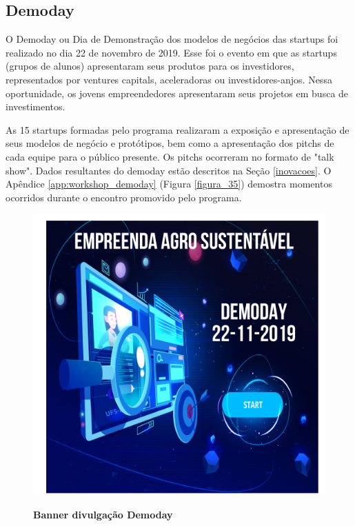 \subsection{Demoday}

O Demoday ou Dia de Demonstração dos modelos de negócios das startups foi realizado no dia 22 de novembro de 2019. Esse foi o evento em que as startups (grupos de alunos) apresentaram seus produtos para os investidores, representados por ventures capitals, aceleradoras ou investidores-anjos. Nessa oportunidade, os jovens empreendedores apresentaram seus projetos em busca de investimentos.

As 15 startups formadas pelo programa realizaram a exposição e apresentação de seus modelos de negócio e protótipos, bem como a apresentação dos pitchs de cada equipe para o público presente. Os pitchs ocorreram no formato de "talk show". Dados resultantes do demoday estão descritos na Seção \ref{inovacoes}. 
O Apêndice \ref{app:workshop_demoday} (Figura \ref{figura_35}) demostra momentos ocorridos durante o encontro promovido pelo programa.



\begin{figure}[H]
\centering
\caption{\textbf{Banner divulgação Demoday}}
\includegraphics[scale=0.4]{Imagens/demoday_banner.png}
\label{fig:ods}
\end{figure}


